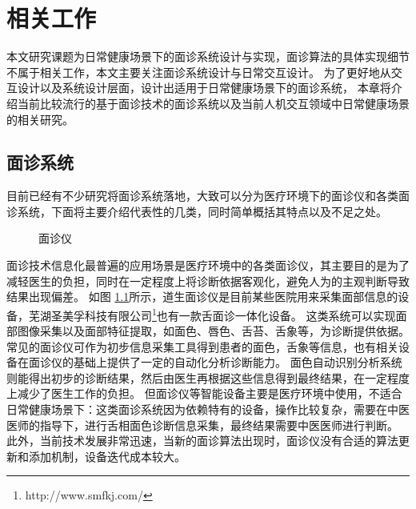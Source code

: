 \chapter{相关工作}
本文研究课题为日常健康场景下的面诊系统设计与实现，面诊算法的具体实现细节不属于相关工作，本文主要关注面诊系统设计与日常交互设计。
为了更好地从交互设计以及系统设计层面，设计出适用于日常健康场景下的面诊系统，
本章将介绍当前比较流行的基于面诊技术的面诊系统以及当前人机交互领域中日常健康场景的相关研究。

\section{面诊系统}

目前已经有不少研究将面诊系统落地，大致可以分为医疗环境下的面诊仪和各类面诊系统，下面将主要介绍代表性的几类，同时简单概括其特点以及不足之处。

\begin{figure}[h]
    \centering
    \caption{面诊仪} 
    \label{fig:med}
\end{figure}

面诊技术信息化最普遍的应用场景是医疗环境中的各类面诊仪，其主要目的是为了减轻医生的负担，同时在一定程度上将诊断依据客观化，避免人为的主观判断导致结果出现偏差。
如图 \ref{fig:med}所示，道生面诊仪\cite{邸丹2016手持式舌象仪的研制}是目前某些医院用来采集面部信息的设备，芜湖圣美孚科技有限公司\footnote{http://www.smfkj.com/}也有一款舌面诊一体化设备。
这类系统可以实现面部图像采集以及面部特征提取，如面色、唇色、舌苔、舌象等，为诊断提供依据。
常见的面诊仪可作为初步信息采集工具得到患者的面色，舌象等信息，也有相关设备在面诊仪的基础上提供了一定的自动化分析诊断能力。
面色自动识别分析系统\cite{崔骥2018人工智能背景下中医诊疗技术的应用与展望}则能得出初步的诊断结果，然后由医生再根据这些信息得到最终结果，在一定程度上减少了医生工作的负担。
但面诊仪等智能设备主要是医疗环境中使用，不适合日常健康场景下：这类面诊系统因为依赖特有的设备，操作比较复杂，需要在中医医师的指导下，进行舌相面色诊断信息采集，最终结果需要中医医师进行判断。
此外，当前技术发展非常迅速，当新的面诊算法出现时，面诊仪没有合适的算法更新和添加机制，设备迭代成本较大。

